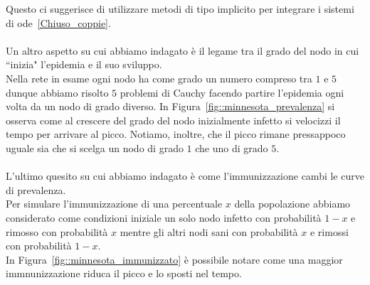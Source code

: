  Questo ci suggerisce di utilizzare metodi di tipo implicito per integrare i sistemi di ode~\ref{Chiuso_coppie}.\\ \\
 Un altro aspetto su cui abbiamo indagato \`e il legame tra il grado del nodo in cui ``inizia" l'epidemia e il suo sviluppo.\\
 Nella rete in esame ogni nodo ha come grado un numero compreso tra $1$ e $5$ dunque abbiamo risolto $5$ problemi di Cauchy facendo partire l'epidemia ogni volta da un nodo di grado diverso. In Figura~\ref{fig::minnesota_prevalenza} si osserva come al crescere del grado del nodo inizialmente infetto si velocizzi il tempo per arrivare al picco. Notiamo, inoltre, che il picco rimane pressappoco uguale sia che si scelga un nodo di grado $1$ che uno di grado $5$.\\ \\
 L'ultimo quesito su cui abbiamo indagato \`e come l'immunizzazione cambi le curve di prevalenza.\\
Per simulare l'immunizzazione di una percentuale $x$  della popolazione abbiamo considerato come condizioni iniziale un solo nodo infetto con probabilit\`a $1-x$ e rimosso con probabilit\`a $x$ mentre gli altri nodi sani con probabilit\`a $x$ e rimossi con probabilit\`a $1-x$.\\
In Figura~\ref{fig::minnesota_immunizzato} \`e possibile notare come una maggior immnunizzazione riduca il picco e lo sposti nel tempo.

